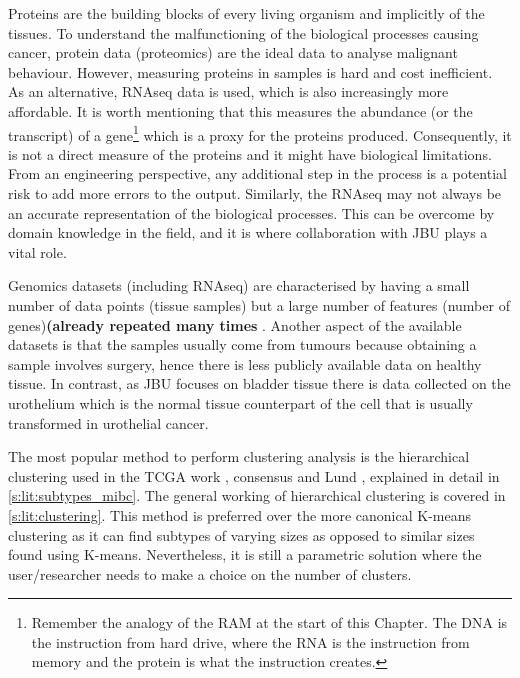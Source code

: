Proteins are the building blocks of every living organism and implicitly of the tissues. To understand the malfunctioning of the biological processes causing cancer, protein data (proteomics) are the ideal data to analyse malignant behaviour. However, measuring proteins in samples is hard and cost inefficient. As an alternative, RNAseq data is used, which is also increasingly more affordable. It is worth mentioning that this measures the abundance (or the transcript) of a gene\footnote{Remember the analogy of the RAM at the start of this Chapter. The DNA is the instruction from hard drive, where the RNA is the instruction from memory and the protein is what the instruction creates.} which is a proxy for the proteins produced. Consequently, it is not a direct measure of the proteins and it might have biological limitations. From an engineering perspective, any additional step in the process is a potential risk to add more errors to the output. Similarly, the RNAseq may not always be an accurate representation of the biological processes. This can be overcome by domain knowledge in the field, and it is where collaboration with JBU plays a vital role.

Genomics datasets (including RNAseq) are characterised by having a small number of data points (tissue samples) but a large number of features (number of genes)\textbf{(already repeated many times} . Another aspect of the available datasets is that the samples usually come from tumours because obtaining a sample involves surgery, hence there is less publicly available data on healthy tissue. In contrast, as JBU focuses on bladder tissue there is data collected on the urothelium which is the normal tissue counterpart of the cell that is usually transformed in urothelial cancer.

The most popular method to perform clustering analysis is the hierarchical clustering used in the TCGA work \citep{Robertson2017-mg}, consensus \citep{Kamoun2020-tj} and Lund \citep{Sjodahl2017-xr}, explained in detail in \cref{s:lit:subtypes_mibc}. The general working of hierarchical clustering is covered in \cref{s:lit:clustering}. This method is preferred over the more canonical K-means clustering as it can find subtypes of varying sizes as opposed to similar sizes found using K-means. Nevertheless, it is still a parametric solution where the user/researcher needs to make a choice on the number of clusters.

